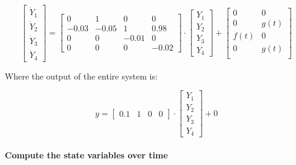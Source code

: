 \documentclass[11pt]{article}
\begin{document}
\[
\left[\begin{array}{c}
\dot{Y}_1 \\ \dot{Y}_2 \\ \dot{Y}_3 \\ \dot{Y}_4
\end{array}\right] = 
\left[\begin{array}{cccc} 
0 & 1 & 0 & 0 \\ -0.03 & -0.05 & 1 & 0.98 \\ 0 & 0 & -0.01 & 0 \\ 0 & 0 & 0 & -0.02
\end{array}\right] \cdot
\left[\begin{array}{c} 
Y_1 \\ Y_2 \\ Y_3 \\ Y_4
\end{array}\right] + 
\left[\begin{array}{cc}
0 & 0 \\ 0 & g(t) \\ f(t) & 0 \\ 0 & g(t) \\
\end{array}\right]
\]

Where the output of the entire system is:

\[
y=\left[\begin{array}{cccc}
0.1 & 1 & 0 & 0 
\end{array}\right] \cdot
\left[\begin{array}{ccc} 
Y_1 \\ Y_2 \\ Y_3 \\ Y_4
\end{array}\right] + 
0
\]

\hypertarget{compute-the-state-variables-over-time}{%
\paragraph{Compute the state variables over
time}\label{compute-the-state-variables-over-time}}
\end{document}
